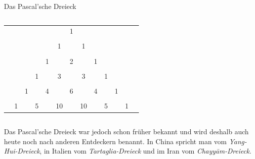 \documentclass[12pt,ngerman,a4paper,ignorenonframetext,]{beamer}
\begin{document}
\begin{frame}{Das Pascal'sche Dreieck}
\protect\hypertarget{das-pascalsche-dreieck}{}

\begin{columns}
        \begin{column}{0.74\textwidth}
            \begin{tabular}{ccccccccccccc}
                &   &   &   &   &   & 1 &   &   &   &   & \\  
                &   &   &   &   &   &   &   &   &   &   &   \\
                &   &   &   &   & 1 &   & 1 &   &   &   & \\  
                &   &   &   &   &   &   &   &   &   &   &   \\
                &   &   &   & 1 &   & 2 &   & 1 &   &   & \\  
                &   &   &   &   &   &   &   &   &   &   &   \\
                &   &   & 1 &   & 3 &   & 3 &   & 1 &   & \\  
                &   &   &   &   &   &   &   &   &   &   &   \\
                &   & 1 &   & 4 &   & 6 &   & 4 &   & 1 & \\
                &   &   &   &   &   &   &   &   &   &   &   \\
                & 1 &   & 5 &   & 10&   & 10&   & 5 &   & 1
            \end{tabular}
        \end{column}
        \begin{column}{0.24\textwidth}
        \end{column}
\end{columns}


\begin{Bemerkung}[]

Das Pascal'sche Dreieck war jedoch schon früher bekannt und wird deshalb
auch heute noch nach anderen \glqq Entdeckern\grqq\xspace benannt. In
China spricht man vom \textit{Yang-Hui-Dreieck}, in Italien vom
\textit{Tartaglia-Dreieck} und im Iran vom \textit{Chayy\={a}m-Dreieck}.

\end{Bemerkung}

\end{frame}
\end{document}
